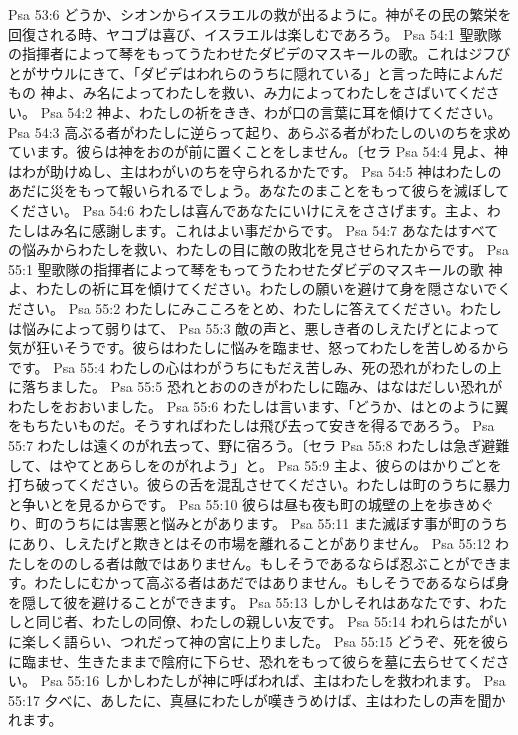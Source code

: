 Psa 53:6  どうか、シオンからイスラエルの救が出るように。神がその民の繁栄を回復される時、ヤコブは喜び、イスラエルは楽しむであろう。
Psa 54:1  聖歌隊の指揮者によって琴をもってうたわせたダビデのマスキールの歌。これはジフびとがサウルにきて、「ダビデはわれらのうちに隠れている」と言った時によんだもの 神よ、み名によってわたしを救い、み力によってわたしをさばいてください。
Psa 54:2  神よ、わたしの祈をきき、わが口の言葉に耳を傾けてください。
Psa 54:3  高ぶる者がわたしに逆らって起り、あらぶる者がわたしのいのちを求めています。彼らは神をおのが前に置くことをしません。〔セラ
Psa 54:4  見よ、神はわが助けぬし、主はわがいのちを守られるかたです。
Psa 54:5  神はわたしのあだに災をもって報いられるでしょう。あなたのまことをもって彼らを滅ぼしてください。
Psa 54:6  わたしは喜んであなたにいけにえをささげます。主よ、わたしはみ名に感謝します。これはよい事だからです。
Psa 54:7  あなたはすべての悩みからわたしを救い、わたしの目に敵の敗北を見させられたからです。
Psa 55:1  聖歌隊の指揮者によって琴をもってうたわせたダビデのマスキールの歌 神よ、わたしの祈に耳を傾けてください。わたしの願いを避けて身を隠さないでください。
Psa 55:2  わたしにみこころをとめ、わたしに答えてください。わたしは悩みによって弱りはて、
Psa 55:3  敵の声と、悪しき者のしえたげとによって気が狂いそうです。彼らはわたしに悩みを臨ませ、怒ってわたしを苦しめるからです。
Psa 55:4  わたしの心はわがうちにもだえ苦しみ、死の恐れがわたしの上に落ちました。
Psa 55:5  恐れとおののきがわたしに臨み、はなはだしい恐れがわたしをおおいました。
Psa 55:6  わたしは言います、「どうか、はとのように翼をもちたいものだ。そうすればわたしは飛び去って安きを得るであろう。
Psa 55:7  わたしは遠くのがれ去って、野に宿ろう。〔セラ
Psa 55:8  わたしは急ぎ避難して、はやてとあらしをのがれよう」と。
Psa 55:9  主よ、彼らのはかりごとを打ち破ってください。彼らの舌を混乱させてください。わたしは町のうちに暴力と争いとを見るからです。
Psa 55:10  彼らは昼も夜も町の城壁の上を歩きめぐり、町のうちには害悪と悩みとがあります。
Psa 55:11  また滅ぼす事が町のうちにあり、しえたげと欺きとはその市場を離れることがありません。
Psa 55:12  わたしをののしる者は敵ではありません。もしそうであるならば忍ぶことができます。わたしにむかって高ぶる者はあだではありません。もしそうであるならば身を隠して彼を避けることができます。
Psa 55:13  しかしそれはあなたです、わたしと同じ者、わたしの同僚、わたしの親しい友です。
Psa 55:14  われらはたがいに楽しく語らい、つれだって神の宮に上りました。
Psa 55:15  どうぞ、死を彼らに臨ませ、生きたままで陰府に下らせ、恐れをもって彼らを墓に去らせてください。
Psa 55:16  しかしわたしが神に呼ばわれば、主はわたしを救われます。
Psa 55:17  夕べに、あしたに、真昼にわたしが嘆きうめけば、主はわたしの声を聞かれます。
